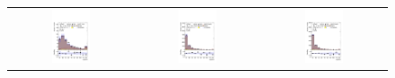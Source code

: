 \documentclass[PAPER, coverpage, atlasdraft=true, texlive=2016, UKenglish]{\ATLASLATEXPATH atlasdoc}
\begin{document}
%
\begin{figure}[H]
\centering
\begin{tabular}{@{}ccc@{}}
\includegraphics[page=1,width=0.33\textwidth]{figures/new_pt/reg1l2tau1bnj_os.pdf} &
\includegraphics[page=1,width=0.33\textwidth]{figures/new_pt/reg1l1tau1b1j_ss.pdf}&
\includegraphics[page=1,width=0.33\textwidth]{figures/new_pt/reg1l1tau1b2j_ss.pdf}\\

\end{tabular}
\end{figure}
\end{document}
